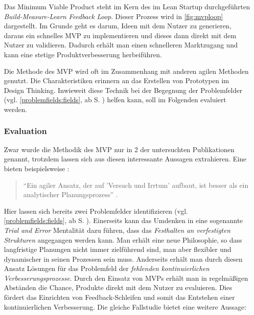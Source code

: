 Das Minimum Viable Product steht im Kern des im Lean Startup durchgeführten \textit{Build-Measure-Learn Feedback Loop}. Dieser Prozess wird in \ref{fig:mvploop} dargestellt. Im Grunde geht es darum, Ideen mit dem Nutzer zu generieren, daraus ein schnelles MVP zu implementieren und dieses dann direkt mit dem Nutzer zu validieren. Dadurch erhält man einen schnelleren Marktzugang und kann eine stetige Produktverbesserung herbeiführen. \cite[S. 102]{grote_fuhrungsinstrumente_2018}

Die Methode des MVP wird oft im Zusammenhang mit anderen agilen Methoden genutzt. Die Charakteristiken erinnern an das Erstellen von Prototypen im Design Thinking. Inwieweit diese Technik bei der Begegnung der Problemfelder (vgl. \ref{problemfields:fields}, ab S. \pageref{problemfields:fields}) helfen kann, soll im Folgenden evaluiert werden.

\subsubsection{Evaluation}

Zwar wurde die Methodik des MVP nur in 2 der untersuchten Publikationen genannt, trotzdem lassen sich aus diesen interessante Aussagen extrahieren. Eine bieten beispielsweise :

\begin{quote}
	``Ein agiler Ansatz, der auf 'Versuch und Irrtum' aufbaut, ist besser als ein analytischer Planungsprozess'' \cite[S. 15]{chanias_digital_2018}.
\end{quote}

Hier lassen sich bereits zwei Problemfelder identifizieren (vgl. \ref{problemfields:fields}, ab S. \pageref{problemfields:fields}). Einerseits kann das Umdenken in eine sogenannte \textit{Trial and Error} Mentalität dazu führen, dass das \textit{Festhalten an verfestigten Strukturen} angegangen werden kann. Man erhält eine neue Philosophie, so dass langfristige Planungen nicht immer zielführend sind, man aber flexibler und dynamischer in seinen Prozessen sein muss. Anderseits erhält man durch diesen Ansatz Lösungen für das Problemfeld der \textit{fehlenden kontinuierlichen Verbesserungsprozesse}. Durch den Einsatz von MVPs erhält man in regelmäßigen Abständen die Chance, Produkte direkt mit dem Nutzer zu evaluieren. Dies fördert das Einrichten von Feedback-Schleifen und somit das Entstehen einer kontinuierlichen Verbesserung. Die gleiche Fallstudie bietet eine weitere Aussage:

